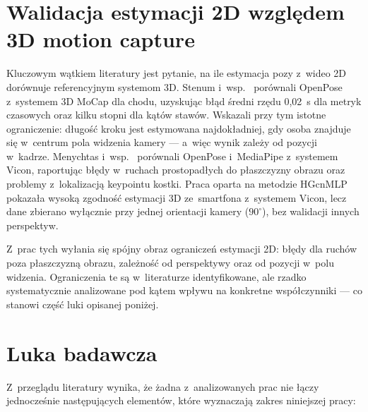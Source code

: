 \section{Walidacja estymacji 2D względem 3D motion capture}
\label{sec:sota-walidacja}

Kluczowym wątkiem literatury jest pytanie, na ile estymacja pozy z~wideo 2D dorównuje referencyjnym systemom 3D. Stenum i~wsp.~\cite{stenum2021} porównali OpenPose z~systemem 3D MoCap dla chodu, uzyskując błąd średni rzędu 0{,}02~s dla metryk czasowych oraz kilku stopni dla kątów stawów. Wskazali przy tym istotne ograniczenie: długość kroku jest estymowana najdokładniej, gdy osoba znajduje się w~centrum pola widzenia kamery --- a~więc wynik zależy od pozycji w~kadrze. Menychtas i~wsp.~\cite{menychtas2023} porównali OpenPose i~MediaPipe z~systemem Vicon, raportując błędy w~ruchach prostopadłych do płaszczyzny obrazu oraz problemy z~lokalizacją keypointu kostki. Praca oparta na metodzie HGcnMLP~\cite{hgcnmlp2024} pokazała wysoką zgodność estymacji 3D ze~smartfona z~systemem Vicon, lecz dane zbierano wyłącznie przy jednej orientacji kamery ($90^\circ$), bez walidacji innych perspektyw.

Z~prac tych wyłania się spójny obraz ograniczeń estymacji 2D: błędy dla ruchów poza płaszczyzną obrazu, zależność od perspektywy oraz od pozycji w~polu widzenia. Ograniczenia te są w~literaturze identyfikowane, ale rzadko systematycznie analizowane pod kątem wpływu na konkretne współczynniki --- co stanowi część luki opisanej poniżej.

\section{Luka badawcza}
\label{sec:sota-luka}

Z~przeglądu literatury wynika, że żadna z~analizowanych prac nie łączy jednocześnie następujących elementów, które wyznaczają zakres niniejszej pracy:

